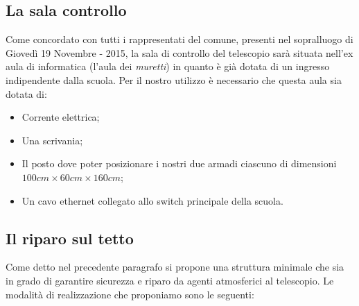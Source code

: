 \documentclass[a4paper,12pt]{article}
\begin{document}
\subsection{La sala controllo}
Come concordato con tutti i rappresentati del comune, presenti nel sopralluogo di Gioved\`i 19 Novembre - 2015, la sala di controllo del telescopio sar\`a situata nell'ex aula di informatica (l'aula dei \textit{muretti}) in quanto \`e gi\`a dotata di un ingresso indipendente dalla scuola. Per il nostro utilizzo \`e necessario che questa aula sia dotata di:
\begin{itemize}
	\item Corrente elettrica;
	\item Una scrivania;
	\item Il posto dove poter posizionare i nostri due armadi ciascuno di dimensioni $100 cm\times 60 cm \times 160 cm $;
	\item Un cavo ethernet collegato allo switch principale della scuola.
\end{itemize}

\subsection{Il riparo sul tetto}
Come detto nel precedente paragrafo si propone una struttura minimale che sia in grado di garantire sicurezza e riparo da agenti atmosferici al telescopio. Le modalit\`a di realizzazione che proponiamo sono le seguenti:
\end{document}
